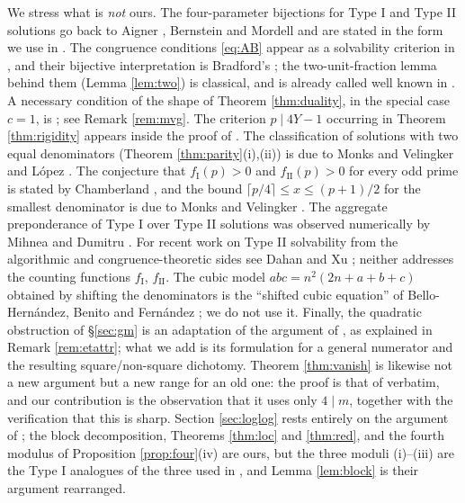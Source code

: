 \documentclass[11pt,reqno]{amsart}
\theoremstyle{plain}
\theoremstyle{definition}
\numberwithin{equation}{section}
\newcommand{\fI}{f_{\mathrm{I}}}
\newcommand{\fII}{f_{\mathrm{II}}}
\begin{document}
We stress what is \emph{not} ours. The four-parameter bijections for Type I and
Type II solutions go back to Aigner \cite{Aigner}, Bernstein \cite{Bernstein} and
Mordell \cite{Mordell} and are stated in the form we use in \cite[Prop.~2.2,
2.3, 2.6, 2.7]{ElsholtzTao}. The congruence conditions \eqref{eq:AB} appear as a solvability criterion in
\cite[Cor.~2.3]{MonksVelingker}, and their bijective interpretation is Bradford's
\cite[Prop.~1--4]{Bradford2}; the two-unit-fraction lemma behind them
(Lemma \ref{lem:two}) is classical, and is already called well known in
\cite[Thm.~2.2]{MonksVelingker}. A necessary condition of the shape of Theorem
\ref{thm:duality}, in the special case $c=1$, is \cite[Thm.~2.1(g)]{MonksVelingker};
see Remark \ref{rem:mvg}. The criterion $p\mid 4Y-1$ occurring in Theorem
\ref{thm:rigidity} appears inside the proof of \cite[Lemma~4]{Bradford1}. The classification of solutions with two equal
denominators (Theorem \ref{thm:parity}(i),(ii)) is due to Monks and Velingker
\cite[Thm.~2.1(h)]{MonksVelingker} and L\'opez \cite{Lopez}. The conjecture that $\fI(p)>0$ and
$\fII(p)>0$ for every odd prime is stated by Chamberland \cite{Chamberland}, and the
bound $\lceil p/4\rceil\le x\le(p+1)/2$ for the smallest denominator is due to Monks
and Velingker \cite[Thm.~2.1(i)]{MonksVelingker}. The aggregate preponderance of Type I over
Type II solutions was observed numerically by Mihnea and Dumitru
\cite{MihneaDumitru}. For recent work on Type II solvability from the algorithmic
and congruence-theoretic sides see Dahan \cite{Dahan} and Xu \cite{Xu}; neither
addresses the counting functions $\fI$, $\fII$. The
cubic model $abc=n^{2}(2n+a+b+c)$ obtained by shifting the denominators is the
``shifted cubic equation'' of Bello-Hern\'andez, Benito and Fern\'andez \cite{BBF};
we do not use it. Finally, the quadratic obstruction of \S\ref{sec:gm} is an
adaptation of the argument of \cite[Prop.~1.6]{ElsholtzTao}, as explained in
Remark \ref{rem:etattr}; what we add is its formulation for a general numerator and
the resulting square/non-square dichotomy. Theorem \ref{thm:vanish} is likewise not a
new argument but a new range for an old one: the proof is that of
\cite[Prop.~1.6]{ElsholtzTao} verbatim, and our contribution is the observation that it
uses only $4\mid m$, together with the verification that this is sharp. Section \ref{sec:loglog} rests entirely on
the argument of \cite[\S8--9]{ElsholtzTao}; the block decomposition, Theorems
\ref{thm:loc} and \ref{thm:red}, and the fourth modulus of Proposition
\ref{prop:four}(iv) are ours, but the three moduli (i)--(iii) are the Type I analogues
of the three used in \cite[\S9]{ElsholtzTao}, and Lemma \ref{lem:block} is their
argument rearranged.
\end{document}
